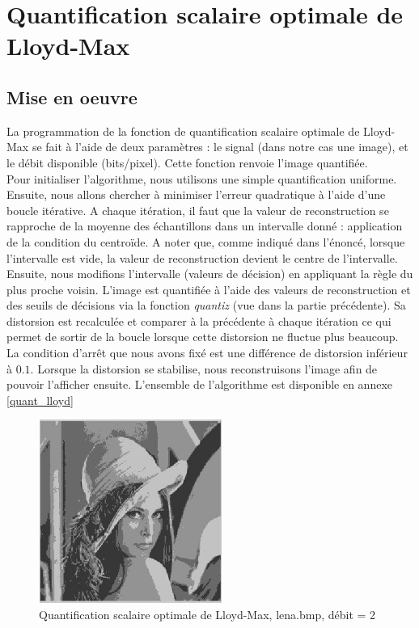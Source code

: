 \documentclass[a4paper, 12pt]{article}
\begin{document}
\section{Quantification scalaire optimale de Lloyd-Max}

\subsection{Mise en oeuvre}

La programmation de la fonction de quantification scalaire optimale de Lloyd-Max se fait à l'aide de deux paramètres : le signal (dans notre cas une image), et le débit disponible (bits/pixel). Cette fonction renvoie l'image quantifiée. \\

Pour initialiser l'algorithme, nous utilisons une simple quantification uniforme. Ensuite, nous allons chercher à minimiser l'erreur quadratique à l'aide d'une boucle itérative. A chaque itération, il faut que la valeur de reconstruction se rapproche de la moyenne des échantillons dans un intervalle donné : application de la condition du centroïde. A noter que, comme indiqué dans l'énoncé, lorsque l'intervalle est vide, la valeur de reconstruction devient le centre de l'intervalle. Ensuite, nous modifions l'intervalle (valeurs de décision) en appliquant la règle du plus proche voisin. L'image est quantifiée à l'aide des valeurs de reconstruction et des seuils de décisions via la fonction \textit{quantiz} (vue dans la partie précédente). Sa distorsion est recalculée et comparer à la précédente à chaque itération ce qui permet de sortir de la boucle lorsque cette distorsion ne fluctue plus beaucoup. La condition d'arrêt que nous avons fixé est une différence de distorsion inférieur à $0.1$. Lorsque la distorsion se stabilise, nous reconstruisons l'image afin de pouvoir l'afficher ensuite. L'ensemble de l'algorithme est disponible en annexe \ref{quant_lloyd}\\

\begin{figure}[H]
	\centering
		\includegraphics[width=6cm, height=6cm]{../lena_quantlloyd_4_niveaux.jpg}
	\caption{Quantification scalaire optimale de Lloyd-Max, lena.bmp, débit = 2}
	\label{fig:lena_quant_4_niveaux}
\end{figure}
\end{document}
